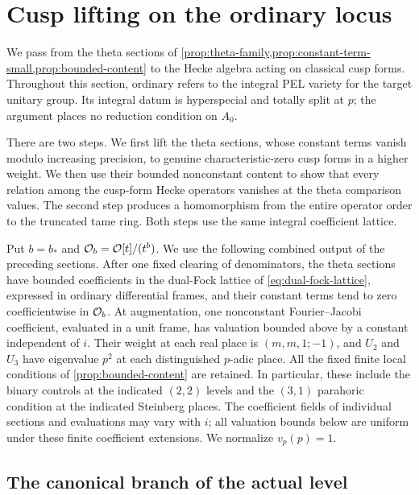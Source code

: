 \section{Cusp lifting on the ordinary locus}
\label{sec:cusp-lifting}

We pass from the theta sections of
\cref{prop:theta-family,prop:constant-term-small,prop:bounded-content}
to the Hecke algebra acting on classical cusp forms.  Throughout this
section, ordinary refers to the integral PEL variety for the target
unitary group.  Its integral datum is hyperspecial and totally split at
$p$; the argument places no reduction condition on $A_0$.

There are two steps.  We first lift the theta sections, whose constant
terms vanish modulo increasing precision, to genuine characteristic-zero
cusp forms in a higher weight.  We then use their bounded nonconstant
content to show that every relation among the cusp-form Hecke operators
vanishes at the theta comparison values.  The second step produces a
homomorphism from the entire operator order to the truncated tame ring.
Both steps use the same integral coefficient lattice.

Put $b=b_*$ and $\mathcal O_b=\mathcal O[t]/(t^b)$.  We use the following combined
output of the preceding sections.  After one fixed clearing of
denominators, the theta sections have bounded coefficients in the
dual-Fock lattice of \cref{eq:dual-fock-lattice}, expressed in
ordinary differential frames, and their constant terms tend to zero
coefficientwise in $\mathcal O_b$.  At augmentation, one nonconstant
Fourier--Jacobi coefficient, evaluated in a unit frame, has valuation
bounded above by a constant independent of $i$.  Their weight at each
real place is $(m,m,1;-1)$, and $U_2$ and $U_3$ have eigenvalue $p^2$
at each distinguished $p$-adic place.  All the fixed finite local
conditions of \cref{prop:bounded-content} are retained.  In particular,
these include the binary controls at the indicated $(2,2)$ levels and
the $(3,1)$ parahoric condition at the indicated Steinberg places.
The coefficient fields of individual sections and evaluations may
vary with $i$; all valuation bounds below are uniform under these
finite coefficient extensions.  We normalize $v_p(p)=1$.

\subsection{The canonical branch of the actual level}

